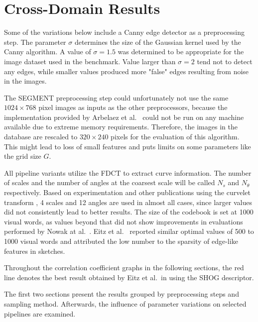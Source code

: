 \section{Cross-Domain Results}\label{sec:cross_results}

Some of the variations below include a Canny edge detector as a preprocessing
step. The parameter $\sigma$ determines the size of the Gaussian kernel used by
the Canny algorithm. A value of $\sigma = 1.5$ was determined to be appropriate
for the image dataset used in the benchmark. Value larger than $\sigma = 2$
tend not to detect any edges, while smaller values produced more "false" edges
resulting from noise in the images.

The SEGMENT preprocessing step could unfortunately not use the same $1024
\times 768$ pixel images as inputs as the other preprocessors, because the
implementation provided by Arbelaez et al.\ \autocite{arbelaez_contour_2011}
could not be run on any machine available due to extreme memory requirements.
Therefore, the images in the database are rescaled to $320 \times 240$ pixels
for the evaluation of this algorithm. This might lead to loss of small features
    and puts limits on some parameters like the grid size $G$.

All pipeline variants utilize the FDCT to extract curve information. The number
of scales and the number of angles at the coarsest scale will be called $N_s$
and $N_{\theta}$ respectively. Based on experimentation and other publications
using the curvelet transform \autocite{mandal_curvelet_2009}
\autocite{guha_curvelet_????}, 4 scales and 12 angles are used in almost all
cases, since larger values did not consistently lead to better results. The
size of the codebook is set at 1000 visual words, as values beyond that did
not show improvements in evaluations performed by Nowak at al.\
\autocite{nowak_sampling_2006}. Eitz et al.\ \autocite{eitz_sketch-based_2010}
reported similar optimal values of 500 to 1000 visual words and attributed the
low number to the sparsity of edge-like features in sketches.

Throughout the correlation coefficient graphs in the following sections, the
red line denotes the best result obtained by Eitz et al.\ in
\autocite{eitz_sketch-based_2010} using the SHOG descriptor.

The first two sections present the results grouped by preprocessing steps and
sampling method. Afterwards, the influence of parameter variations on selected
pipelines are examined.






